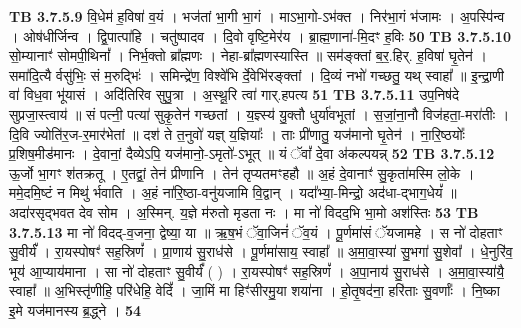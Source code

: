 \documentclass[17pt]{extarticle}
\begin{document}
{{{{{{{{{{{{{{{{{{{                                \textbf{ TB 3.7.5.9} \newline
                  वि॒धेम॑ ह॒विषा॑ व॒यं । भज॑तां भा॒गी भा॒गं । माऽभा॒गो-ऽभ॑क्त । निर॑भा॒गं भ॑जामः । अ॒पस्पि॑न्व । ओष॑धीर्जिन्व । द्वि॒पात्पा॑हि । चतु॑ष्पादव । दि॒वो वृष्टि॒मेर॑य । ब्रा॒ह्म॒णाना॑-मि॒दꣳ ह॒विः \textbf{ 50} \newline
                  \newline
                                \textbf{ TB 3.7.5.10} \newline
                  सो॒म्यानाꣳ॑ सोमपी॒थिनां᳚ । निर्भ॒क्तो ब्रा᳚ह्मणः । नेहा-ब्रा᳚ह्मणस्यास्ति ॥ सम॑ङ्क्तां ब॒र॒.हिर्. ह॒विषा॑ घृ॒तेन॑ । समा॑दि॒त्यै र्वसु॑भिः॒ सं म॒रुद्भिः॑ । समिन्द्रे॑ण॒ विश्वे॑भि र्दे॒वेभि॑रङ्क्तां । दि॒व्यं नभो॑ गच्छतु॒ यथ् स्वाहा᳚ ॥ इ॒न्द्रा॒णी वा॑ विध॒वा भू॑यासं । अदि॑तिरिव सुपु॒त्रा । अ॒स्थू॒रि त्वा॑ गार्.हपत्य \textbf{ 51} \newline
                  \newline
                                \textbf{ TB 3.7.5.11} \newline
                  उप॒निष॑दे सुप्रजा॒स्त्वाय॑ ॥ सं पत्नी॒ पत्या॑ सुकृ॒तेन॑ गच्छतां । य॒ज्ञ्स्य॑ यु॒क्तौ धुर्या॑वभूतां । स॒जां॒ना॒नौ विज॑हता॒-मरा॑तीः । दि॒वि ज्योति॑र॒ज-र॒मार॑भेतां ॥ दश॑ ते त॒नुवो॑ यज्ञ् य॒ज्ञियाः᳚ । ताः प्री॑णातु॒ यज॑मानो घृ॒तेन॑ । ना॒रि॒ष्ठयोः᳚ प्र॒शिष॒मीड॑मानः । दे॒वानां॒ दैव्येऽपि॒ यज॑मानो॒-ऽमृतो॑-ऽभूत् ॥ यं ॅवां᳚ दे॒वा अ॑कल्पयन्न् \textbf{ 52} \newline
                  \newline
                                \textbf{ TB 3.7.5.12} \newline
                  ऊ॒र्जो भा॒गꣳ श॑तक्रतू । ए॒तद्वां॒ तेन॑ प्रीणानि । तेन॑ तृप्यतमꣳहहौ ॥ अ॒हं दे॒वानाꣳ॑ सु॒कृता॑मस्मि लो॒के । ममे॒दमि॒ष्टं न मिथु॑ र्भवाति । अ॒हं ना॑रि॒ष्ठा-वनु॑यजामि वि॒द्वान् । यदा᳚भ्या॒-मिन्द्रो॒ अद॑धा-द्भाग॒धेयं᳚ ॥ अदा॑रसृद्भवत देव सोम । अ॒स्मिन्. य॒ज्ञे म॑रुतो मृडता नः । मा नो॑ विदद॒भि भा॒मो अश॑स्तिः \textbf{ 53} \newline
                  \newline
                                \textbf{ TB 3.7.5.13} \newline
                  मा नो॑ विदद्-व॒जना॒ द्वेष्या॒ या ॥ ऋ॒ष॒भं ॅवा॒जिनं॑ ॅव॒यं । पू॒र्णमा॑सं ॅयजामहे । स नो॑ दोहताꣳ सु॒वीर्यं᳚ । रा॒यस्पोषꣳ॑ सह॒स्रिणं᳚ । प्रा॒णाय॑ सु॒राध॑से । पू॒र्णमा॑साय॒ स्वाहा᳚ ॥ अ॒मा॒वा॒स्या॑ सु॒भगा॑ सु॒शेवा᳚ । धे॒नुरि॑व॒ भूय॑ आ॒प्याय॑माना । सा नो॑ दोहताꣳ सु॒वीर्यं᳚ ( ) । रा॒यस्पोषꣳ॑ सह॒स्रिणं᳚ । अ॒पा॒नाय॑ सु॒राध॑से । अ॒मा॒वा॒स्या॑यै॒ स्वाहा᳚ ॥ अ॒भिस्तृ॑णीहि॒ परि॑धेहि॒ वेदिं᳚ । जा॒मिं मा हिꣳ॑सीरमु॒या शया॑ना । हो॒तृ॒षद॑ना॒ हरि॑ताः सु॒वर्णाः᳚ । नि॒ष्का इ॒मे यज॑मानस्य ब्र॒द्ध्ने । \textbf{ 54} \newline
}}}}}}}}}}}}}}}}}}}
\end{document}
